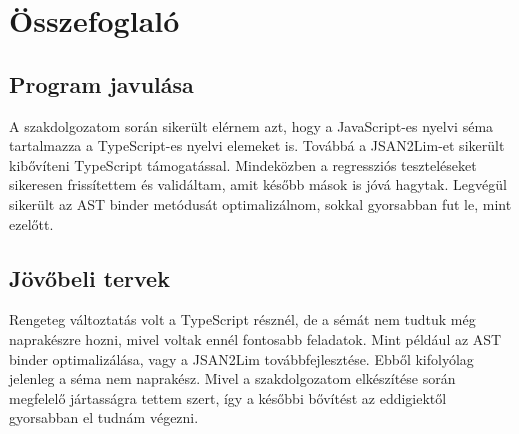 \chapter{Összefoglaló}\label{chap:Összefoglaló}

\section{Program javulása}

\noindent

A szakdolgozatom során sikerült elérnem azt, hogy a JavaScript-es nyelvi séma tartalmazza a TypeScript-es nyelvi elemeket is.
Továbbá a JSAN2Lim-et sikerült kibővíteni TypeScript támogatással.
Mindeközben a regressziós teszteléseket sikeresen frissítettem és validáltam, amit később mások is jóvá hagytak.
Legvégül sikerült az AST binder metódusát optimalizálnom, sokkal gyorsabban fut le, mint ezelőtt.

\section{Jövőbeli tervek}

\noindent

Rengeteg változtatás volt a TypeScript résznél, de a sémát nem tudtuk még naprakészre hozni, mivel voltak ennél fontosabb feladatok.
Mint például az AST binder optimalizálása, vagy a JSAN2Lim továbbfejlesztése.
Ebből kifolyólag jelenleg a séma nem naprakész.
Mivel a szakdolgozatom elkészítése során megfelelő jártasságra tettem szert, így a későbbi bővítést az eddigiektől gyorsabban el tudnám végezni.
